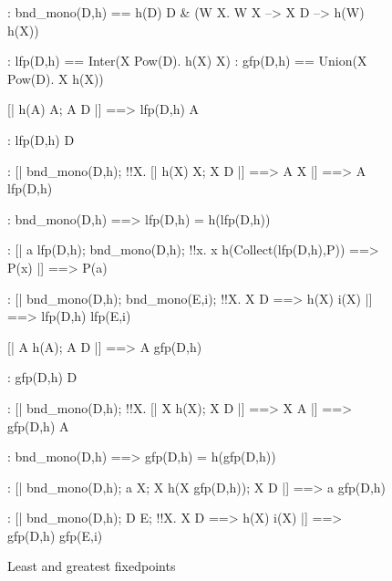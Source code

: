 \begin{figure}
\begin{alltt*}\isastyleminor
{}:  bnd_mono(D,h) == 
                 h(D) \isasymsubseteq D & ({\isasymforall}W X. W \isasymsubseteq X --> X \isasymsubseteq D --> h(W) \isasymsubseteq h(X))

:       lfp(D,h) == Inter({\ttlbrace}X \isasymin Pow(D). h(X) \isasymsubseteq X{\ttrbrace})
:       gfp(D,h) == Union({\ttlbrace}X \isasymin Pow(D). X \isasymsubseteq h(X){\ttrbrace})


 [| h(A) \isasymsubseteq A;  A \isasymsubseteq D |] ==> lfp(D,h) \isasymsubseteq A

:    lfp(D,h) \isasymsubseteq D

:  [| bnd_mono(D,h);  
                  !!X. [| h(X) \isasymsubseteq X;  X \isasymsubseteq D |] ==> A \isasymsubseteq X 
               |] ==> A \isasymsubseteq lfp(D,h)

:    bnd_mono(D,h) ==> lfp(D,h) = h(lfp(D,h))

:        [| a \isasymin lfp(D,h);  bnd_mono(D,h);
                  !!x. x \isasymin h(Collect(lfp(D,h),P)) ==> P(x)
               |] ==> P(a)

:      [| bnd_mono(D,h);  bnd_mono(E,i);
                  !!X. X \isasymsubseteq D ==> h(X) \isasymsubseteq i(X)  
               |] ==> lfp(D,h) \isasymsubseteq lfp(E,i)

 [| A \isasymsubseteq h(A);  A \isasymsubseteq D |] ==> A \isasymsubseteq gfp(D,h)

:    gfp(D,h) \isasymsubseteq D

:     [| bnd_mono(D,h);  
                  !!X. [| X \isasymsubseteq h(X);  X \isasymsubseteq D |] ==> X \isasymsubseteq A
               |] ==> gfp(D,h) \isasymsubseteq A

:    bnd_mono(D,h) ==> gfp(D,h) = h(gfp(D,h))

:      [| bnd_mono(D,h); a \isasymin X; X \isasymsubseteq h(X \isasymunion gfp(D,h)); X \isasymsubseteq D 
               |] ==> a \isasymin gfp(D,h)

:      [| bnd_mono(D,h);  D \isasymsubseteq E;
                  !!X. X \isasymsubseteq D ==> h(X) \isasymsubseteq i(X)  
               |] ==> gfp(D,h) \isasymsubseteq gfp(E,i)
\end{alltt*}
\caption{Least and greatest fixedpoints} \label{zf-fixedpt}
\end{figure}


